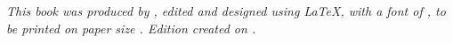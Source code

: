 \cleardoublepage

\null
\vfill
\newpage

\null
\vfill
\thispagestyle{empty}



{\normalsize \it This book was produced by \BookAuthor, edited and designed using \LaTeX,
with a font of \fprshowfont,
to be printed on paper size \BookPaperSizeString. Edition created on \BookEditionDate.
\vspace*{4pt}}





